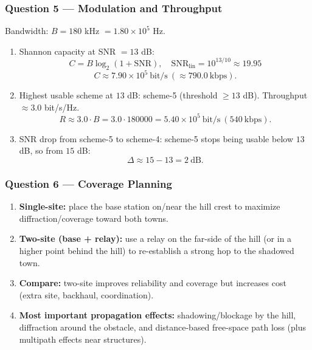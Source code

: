 \documentclass[11pt,a4paper]{article}
\begin{document}
\subsubsection*{Question 5 --- Modulation and Throughput}
Bandwidth: $B=180$ kHz $=1.80\times 10^5$ Hz.

\begin{enumerate}[label=\alph*.]
    \item Shannon capacity at SNR $=13$ dB:
    \[
    C=B\log_2(1+\mathrm{SNR}),\quad \mathrm{SNR}_{\text{lin}}=10^{13/10}\approx 19.95
    \]
    \[
    C\approx 7.90\times 10^5\ \text{bit/s}\ (\approx 790.0\ \text{kbps}).
    \]
    \item Highest usable scheme at $13$ dB: scheme-5 (threshold $\ge 13$ dB). Throughput $\approx 3.0$ bit/s/Hz.
    \[
    R\approx 3.0\cdot B=3.0\cdot 180000=5.40\times 10^5\ \text{bit/s}\ (540\ \text{kbps}).
    \]
    \item SNR drop from scheme-5 to scheme-4:
    scheme-5 stops being usable below $13$ dB, so from $15$ dB:
    \[
    \Delta \approx 15-13=2\ \text{dB}.
    \]
\end{enumerate}

\subsubsection*{Question 6 --- Coverage Planning}
\begin{enumerate}[label=\alph*.]
    \item \textbf{Single-site:} place the base station on/near the hill crest to maximize diffraction/coverage toward both towns.
    \item \textbf{Two-site (base + relay):} use a relay on the far-side of the hill (or in a higher point behind the hill) to re-establish a strong hop to the shadowed town.
    \item \textbf{Compare:} two-site improves reliability and coverage but increases cost (extra site, backhaul, coordination).
    \item \textbf{Most important propagation effects:} shadowing/blockage by the hill, diffraction around the obstacle, and distance-based free-space path loss (plus multipath effects near structures).
\end{enumerate}
\end{document}
